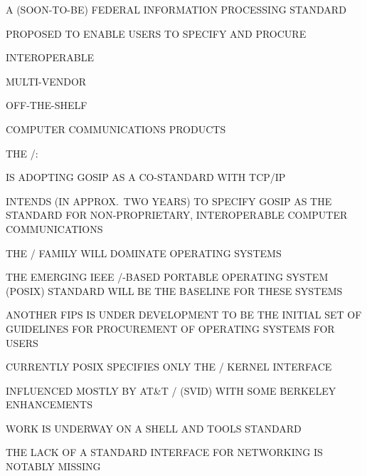 \begin{bwslide}

\begin{nrtc}
\item	A (SOON-TO-BE) FEDERAL INFORMATION PROCESSING STANDARD

\item	PROPOSED TO ENABLE USERS TO SPECIFY AND PROCURE
	\begin{nrtc}
	\item	INTEROPERABLE

	\item	MULTI-VENDOR

	\item	OFF-THE-SHELF
	\end{nrtc}
	COMPUTER COMMUNICATIONS PRODUCTS

\item	THE \dod/:
    \begin{nrtc}
    \item	IS ADOPTING GOSIP AS A CO-STANDARD WITH TCP/IP

    \item	INTENDS (IN APPROX.~TWO YEARS) TO SPECIFY GOSIP AS THE 
		 STANDARD FOR NON-PROPRIETARY, INTEROPERABLE
		COMPUTER COMMUNICATIONS
    \end{nrtc}
\end{nrtc}
\end{bwslide}


\begin{bwslide}

\begin{nrtc}
\item	THE \unix/ FAMILY WILL DOMINATE OPERATING SYSTEMS

\item	THE EMERGING IEEE \unix/-BASED PORTABLE OPERATING SYSTEM (POSIX)
	STANDARD WILL BE THE BASELINE FOR THESE SYSTEMS

\item	ANOTHER FIPS IS UNDER DEVELOPMENT TO BE THE INITIAL SET OF
	GUIDELINES FOR PROCUREMENT OF OPERATING SYSTEMS FOR USERS
\end{nrtc}
\end{bwslide}


\begin{bwslide}

\begin{nrtc}
\item	CURRENTLY POSIX SPECIFIES ONLY THE \unix/ KERNEL INTERFACE
    \begin{nrtc}
    \item	INFLUENCED MOSTLY BY AT\&T \unix/ (SVID) WITH SOME BERKELEY
		ENHANCEMENTS
    \end{nrtc}

\item	WORK IS UNDERWAY ON A SHELL AND TOOLS STANDARD

\item	THE LACK OF A STANDARD INTERFACE FOR NETWORKING IS NOTABLY MISSING
\end{nrtc}
\end{bwslide}


